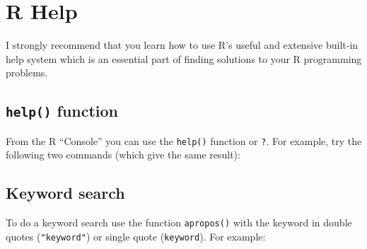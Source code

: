 \documentclass[letterpaperpaper,9pt,twocolumn,twoside,printwatermark=false]{pinp}
\begin{document}
\hypertarget{r-help}{%
\section{R Help}\label{r-help}}

I strongly recommend that you learn how to use R's useful and extensive
built-in help system which is an essential part of finding solutions to
your R programming problems.

\hypertarget{help-function}{%
\subsection{\texorpdfstring{\texttt{help()}
function}{help() function}}\label{help-function}}

From the R ``Console'' you can use the \texttt{help()} function or
\texttt{?}. For example, try the following two commands (which give the
same result):

\begin{Shaded}
\begin{Highlighting}[]
\end{Highlighting}
\end{Shaded}

\hypertarget{keyword-search}{%
\subsection{Keyword search}\label{keyword-search}}

To do a keyword search use the function \texttt{apropos()} with the
keyword in double quotes (\texttt{"keyword"}) or single quote
(\texttt{\textquotesingle{}keyword\textquotesingle{}}). For example:

\begin{Shaded}
\begin{Highlighting}[]
\NormalTok{(}\NormalTok{)}
\end{Highlighting}
\end{Shaded}
\end{document}
